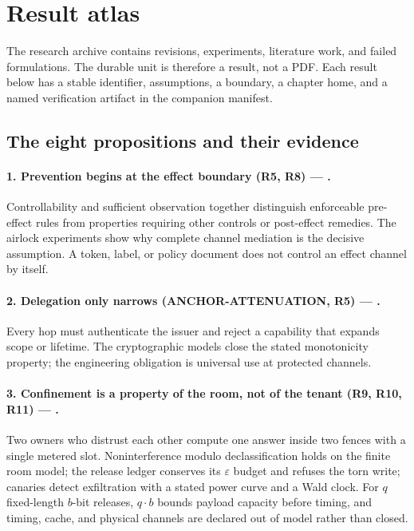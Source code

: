 \section{Result atlas}\label{app:result-atlas}\label{app:one-spine}

The research archive contains revisions, experiments, literature work, and
failed formulations. The durable unit is therefore a result, not a PDF. Each
result below has a stable identifier, assumptions, a boundary, a chapter home,
and a named verification artifact in the companion manifest.

\subsection{The eight propositions and their evidence}

\paragraph{1. Prevention begins at the effect boundary (R5, R8) --- .}
Controllability and sufficient observation together distinguish enforceable
pre-effect rules from properties requiring other controls or post-effect remedies. The airlock experiments show why complete
channel mediation is the decisive assumption. A token, label, or policy document
does not control an effect channel by itself.

\paragraph{2. Delegation only narrows (ANCHOR-ATTENUATION, R5) --- .}
Every hop must authenticate the issuer and reject a capability that expands
scope or lifetime. The cryptographic models close the stated monotonicity
property; the engineering obligation is universal use at protected channels.

\paragraph{3. Confinement is a property of the room, not of the tenant (R9, R10, R11) --- .}
Two owners who distrust each other compute one answer inside two fences with a
single metered slot. Noninterference modulo declassification holds on the
finite room model; the release ledger conserves its $\varepsilon$ budget and
refuses the torn write; canaries detect exfiltration with a stated power curve
and a Wald clock. For $q$ fixed-length $b$-bit releases, $q\cdot b$ bounds payload capacity before
timing, and timing, cache, and physical channels are declared out of model
rather than closed.


